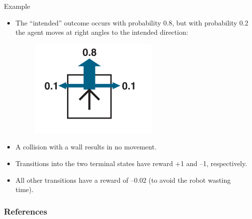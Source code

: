 \documentclass[handout]{beamer}
\begin{document}
\begin{frame}{Example}
\scriptsize{
\begin{itemize}
\item The ``intended'' outcome occurs with probability 0.8, but with probability 0.2 the agent moves at right angles to the intended direction:

  \begin{figure}[h]
        	\includegraphics[scale = 0.4]{pics/example1.png}
        \end{figure}

\item A collision with a wall results in no movement.

\item Transitions into the two terminal states have reward +1 and –1, respectively.

\item All other transitions have a reward of –0.02 (to avoid the robot wasting time).
\end{itemize}


} 

\end{frame}

\begin{frame}[allowframebreaks]\scriptsize
\frametitle{References}


%
\end{frame}  









\end{document}

